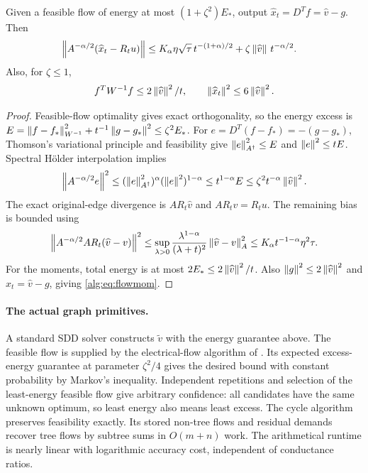 \begin{lemma}\label{alg:lem:flow}
Given a feasible flow of energy at most $(1+\zeta^2)E_*$, output
$\widehat x_t=D^Tf=\widehat v-g$. Then
\begin{align}
 \left\lVert A^{-\alpha/2}(\widehat x_t-R_tu)\right\rVert
 &\le K_\alpha\eta\sqrt\tau\,t^{-(1+\alpha)/2}
       +\zeta\left\lVert\widehat v\right\rVert\,t^{-\alpha/2}.\label{alg:eq:flowerr}
\end{align}
Also, for $\zeta\le1$,
\begin{equation}\label{alg:eq:flowmom}
 f^TW^{-1}f\le2\left\lVert\widehat v\right\rVert^2/t,
 \qquad \left\lVert\widehat x_t\right\rVert^2\le6\left\lVert\widehat v\right\rVert^2.
\end{equation}
\end{lemma}
\begin{proof}
Feasible-flow optimality gives exact orthogonality, so the energy excess
is
$E=\left\lVert f-f_*\right\rVert_{W^{-1}}^2+t^{-1}\left\lVert g-g_*\right\rVert^2\le\zeta^2E_*$.
For $e=D^T(f-f_*)=-(g-g_*)$, Thomson's variational principle and
feasibility give $\left\lVert e\right\rVert_{A^\dagger}^2\le E$ and
$\left\lVert e\right\rVert^2\le tE$. Spectral H\"older interpolation implies
\[
 \left\lVert A^{-\alpha/2}e\right\rVert^2
 \le(\left\lVert e\right\rVert_{A^\dagger}^2)^\alpha(\left\lVert e\right\rVert^2)^{1-\alpha}
 \le t^{1-\alpha}E
 \le\zeta^2t^{-\alpha}\left\lVert\widehat v\right\rVert^2.
\]
The exact original-edge divergence is $A R_t\widehat v$ and
$A R_t v=R_tu$. The remaining bias is bounded using
\[
 \left\lVert A^{-\alpha/2}A R_t(\widehat v-v)\right\rVert^2
 \le\sup_{\lambda>0}
 \frac{\lambda^{1-\alpha}}{(\lambda+t)^2}
 \left\lVert\widehat v-v\right\rVert_A^2
 \le K_\alpha t^{-1-\alpha}\eta^2\tau.
\]
For the moments, total energy is at most
$2E_*\le2\left\lVert\widehat v\right\rVert^2/t$.
Also $\left\lVert g\right\rVert^2\le2\left\lVert\widehat v\right\rVert^2$ and
$\widehat x_t=\widehat v-g$, giving \eqref{alg:eq:flowmom}.
\end{proof}

\paragraph{The actual graph primitives.}
A standard SDD solver constructs $\widetilde v$ with the energy
guarantee above. The feasible flow is supplied by the electrical-flow
algorithm of \cite[Definition 2.4, Theorems 3.2 and 4.1]{KOSZ}.
Its expected excess-energy guarantee at parameter $\zeta^2/4$ gives
the desired bound with constant probability by Markov's inequality.
Independent repetitions and selection of the least-energy feasible
flow give arbitrary confidence: all candidates have the same unknown
optimum, so least energy also means least excess. The cycle algorithm
preserves feasibility exactly. Its stored non-tree flows and residual
demands recover tree flows by subtree sums in $O(m+n)$ work. The
arithmetical runtime is nearly linear with logarithmic accuracy cost,
independent of conductance ratios.

